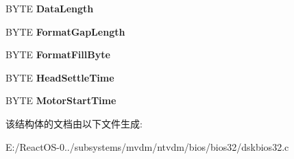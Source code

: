 \begin{DoxyCompactItemize}
B\+Y\+TE {\bfseries Data\+Length}
\item 
\mbox{\label{struct___f_l_o_p_p_y___p_a_r_a_m___t_a_b_l_e_aa5ebdb66241789a12220e849934d3fb1}} 
B\+Y\+TE {\bfseries Format\+Gap\+Length}
\item 
\mbox{\label{struct___f_l_o_p_p_y___p_a_r_a_m___t_a_b_l_e_a1b57b7f832a3c9de7cc1a0aa851870af}} 
B\+Y\+TE {\bfseries Format\+Fill\+Byte}
\item 
\mbox{\label{struct___f_l_o_p_p_y___p_a_r_a_m___t_a_b_l_e_aa0c2df86c1e6385c0a0bf8e1a21cae12}} 
B\+Y\+TE {\bfseries Head\+Settle\+Time}
\item 
\mbox{\label{struct___f_l_o_p_p_y___p_a_r_a_m___t_a_b_l_e_aad4fb35b3a795ac1af59a6ea35c645f9}} 
B\+Y\+TE {\bfseries Motor\+Start\+Time}
\end{DoxyCompactItemize}


该结构体的文档由以下文件生成\+:\begin{DoxyCompactItemize}
\item 
E\+:/\+React\+O\+S-\/0../subsystems/mvdm/ntvdm/bios/bios32/dskbios32.\+c\end{DoxyCompactItemize}
